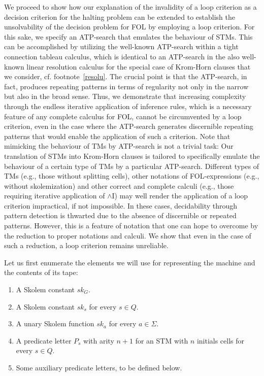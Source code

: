 \documentclass[%
  manuscript=article,   %
  year=2024,
  volume=77,
  doi=00000.000,
]{zfn}
\begin{document}
We proceed to show how our explanation of the invalidity of a loop criterion as a decision criterion for the halting problem can be extended to establish the unsolvability of the decision problem for FOL by employing a loop criterion. For this sake, we specify an ATP-search that emulates the behaviour of STMs. This can be accomplished by utilizing the well-known ATP-search within a tight connection tableau calculus, which is identical to an ATP-search in the also well-known linear resolution calculus for the special case of Krom-Horn clauses that we consider, cf. footnote~\ref{resolu}. The crucial point is that the ATP-search, in fact, produces repeating patterns in terms of regularity not only in the narrow but also in the broad sense. Thus, we demonstrate that increasing complexity through the endless iterative application of inference rules, which is a necessary feature of any complete calculus for FOL, cannot be circumvented by a loop criterion, even in the case where the ATP-search generates discernible repeating patterns that would enable the application of such a criterion. Note that mimicking the behaviour of TMs by ATP-search is not a trivial task: Our translation of STMs into Krom-Horn clauses is tailored to specifically emulate the behaviour of a certain type of TMs by a particular ATP-search. Different types of TMs (e.g., those without splitting cells), other notations of FOL-expressions (e.g., without skolemization) and other correct and complete calculi (e.g., those requiring iterative application of $\wedge$I) may well render the application of a loop criterion impractical, if not impossible. In these cases, decidability through pattern detection is thwarted due to the absence of discernible or repeated patterns. However, this is a feature of notation that one can hope to overcome by the reduction to proper notations and calculi. We show that even in the case of such a reduction, a loop criterion remains unreliable.

Let us first enumerate the elements we will use for representing the machine and the contents of its tape:

\begin{enumerate}
\item A Skolem constant $sk_G$.
\item A Skolem constant $sk_s$ for every $s \in Q$. \label{sks}
\item A unary Skolem function $sk_a$ for every $a \in \Sigma$. 
\item A predicate letter $P_s$ with arity $n+1$ for an STM with $n$ initials cells for every $s \in Q$.
\item Some auxiliary predicate letters, to be defined below.
\end{enumerate}
\end{document}
